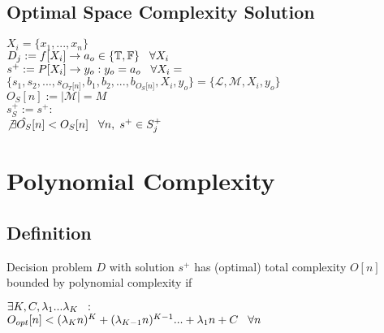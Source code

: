 \documentclass[11pt]{article}
\begin{document}
\subsection{Optimal Space Complexity Solution}

\begin{center}
$
X_i = \{x_1,...,x_n\}
$
\\ \vspace{2mm}
$
D_j := f \lbrack X_i \rbrack \rightarrow a_{o} \in \{\mathbb{T}, \mathbb{F}\} \hspace{3mm} \forall X_i
$
\\ \vspace{2mm}
$
s^+ := P \lbrack X_i \rbrack \rightarrow y_{o} : y_o = a_{o} \hspace{3mm} \forall X_i = 
$
\\ \vspace{2mm}
$
\{ s_1,s_2,...,s_{O_T \lbrack n \rbrack }, b_1, b_2,...,b_{O_S \lbrack n \rbrack},X_i,y_o \} = \{ \mathcal{L},\mathcal{M},X_i,y_o\}
$
\\ \vspace{3mm}
$
O_S[n] := |\mathcal{M}| = M
$
\\ \vspace{2mm}
$
s_{S}^+ := s^+ :
$
\\ \vspace{2mm}
$
\not \exists \hat{O_S} \lbrack n \rbrack < O_{S}[n] \hspace{3mm} \forall n, \hspace{1mm}  s^+ \in S_j^+
$
\end{center}






















\section{Polynomial Complexity}

\subsection{Definition}
Decision problem $D$ with solution $s^+$ has (optimal) total complexity $O[n]$ bounded by polynomial complexity if
\begin{center}
$\exists K,C,\lambda_1...\lambda_K \hspace{2mm} :$
\\ \vspace{2mm}
$O_{opt}[n] < (\lambda_K n)^K + (\lambda_{K-1} n)^{K-1}... + \lambda_1 n + C \hspace{3mm} \forall n$
\end{center}
\end{document}
